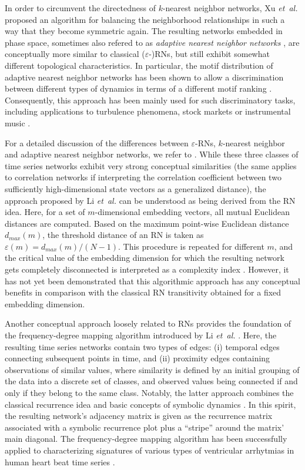 In order to circumvent the directedness of $k$-nearest neighbor networks, Xu \textit{et~al.} \cite{Small2009,Xu2008} proposed an algorithm for balancing the neighborhood relationships in such a way that they become symmetric again. The resulting networks embedded in phase space, sometimes also refered to as \emph{adaptive nearest neighbor networks} \cite{Donner2011IJBC}, are conceptually more similar to classical ($\varepsilon$-)RNs, but still exhibit somewhat different topological characteristics. In particular, the motif distribution of adaptive nearest neighbor networks has been shown to allow a discrimination between different types of dynamics in terms of a different motif ranking \cite{Liu2010,Xu2008}. Consequently, this approach has been mainly used for such discriminatory tasks, including applications to turbulence phenomena, stock markets \cite{Liu2010} or instrumental music \cite{Donner2011IJBC}.

For a detailed discussion of the differences between $\varepsilon$-RNs, $k$-nearest neighbor and adaptive nearest neighbor networks, we refer to \cite{Donner2011IJBC}. While these three classes of time series networks exhibit very strong conceptual similarities (the same applies to correlation networks \cite{Yang2008} if interpreting the correlation coefficient between two sufficiently high-dimensional state vectors as a generalized distance), the approach proposed by Li \textit{et~al.} \cite{Li2011a,Li2011b} can be understood as being derived from the RN idea. Here, for a set of $m$-dimensional embedding vectors, all mutual Euclidean distances are computed. Based on the maximum point-wise Euclidean distance $d_{max}(m)$, the threshold distance of an RN is taken as $\varepsilon(m)=d_{max}(m)/(N-1)$. This procedure is repeated for different $m$, and the critical value of the embedding dimension for which the resulting network gets completely disconnected is interpreted as a complexity index \cite{Cao2013}. However, it has not yet been demonstrated that this algorithmic approach has any conceptual benefits in comparison with the classical RN transitivity obtained for a fixed embedding dimension.

Another conceptual approach loosely related to RNs provides the foundation of the frequency-degree mapping algorithm introduced by Li \textit{et~al.} \cite{Li2012}. Here, the resulting time series networks contain two types of edges: (i) temporal edges connecting subsequent points in time, and (ii) proximity edges containing observations of similar values, where similarity is defined by an initial grouping of the data into a discrete set of classes, and observed values being connected if and only if they belong to the same class. Notably, the latter approach combines the classical recurrence idea and basic concepts of symbolic dynamics \cite{Daw2003}. In this spirit, the resulting network's adjacency matrix is given as the recurrence matrix associated with a symbolic recurrence plot \cite{Donner2008,Faure2010,Graben2013} plus a ``stripe'' around the matrix' main diagonal. The frequency-degree mapping algorithm has been successfully applied to characterizing signatures of various types of ventricular arrhytmias in human heart beat time series \cite{Li2012}.



